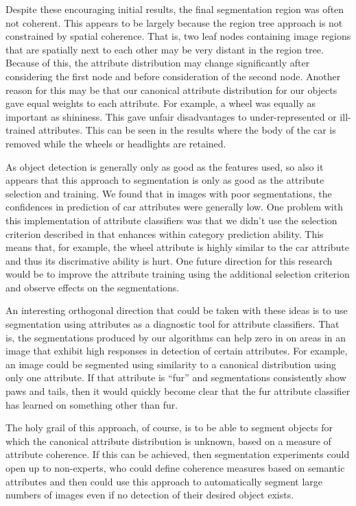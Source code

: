 \documentclass[10pt,twocolumn,letterpaper]{article}
\begin{document}
Despite these encouraging initial results, the final segmentation region
was often not coherent.
This appears to be largely because the region tree approach is not
constrained by spatial coherence.  That is, two leaf nodes containing image
regions that are spatially next to each other may be very distant in the
region tree.  Because of this, the attribute distribution may change significantly
after considering the first node and before consideration of the second node.
Another reason for this may be that our canonical attribute distribution for
our objects gave equal weights to each attribute.  For example, a wheel was
equally as important as shininess.  This gave unfair disadvantages to
under-represented or ill-trained attributes.  This can be seen in the results
where the body of the car is removed while the wheels or headlights are
retained.

As object detection is generally only as good as the features used, so also it
appears that this approach to segmentation is only as good as the attribute
selection and training.  We found that in images with poor segmentations, the
confidences in prediction of car attributes were generally low.  One problem
with this implementation of attribute classifiers was that we didn't use
the selection criterion described in \cite{farhadi09} that enhances within
category prediction ability.  This means that, for example, the wheel attribute
is highly similar to the car attribute and thus its discrimative ability
is hurt.  One future direction for this research would be to improve the attribute
training using the additional selection criterion and observe effects on
the segmentations.

An interesting orthogonal direction that could be taken with these ideas is to
use segmentation using attributes as a diagnostic tool for attribute classifiers.
That is, the segmentations produced by our algorithms can help zero in on areas
in an image that exhibit high responses in detection of certain attributes.
For example, an image could be segmented using similarity to a canonical distribution
using only one attribute.  If that attribute is ``fur'' and segmentations
consistently show paws and tails, then it would quickly become clear that
the fur attribute classifier has learned on something other than fur.

The holy grail of this approach, of course, is to be able to segment objects
for which the canonical attribute distribution is unknown, based on a measure
of attribute coherence.  If this can be achieved, then segmentation experiments
could open up to non-experts, who could define coherence measures based on
semantic attributes and then could use this approach to automatically segment large
numbers of images even if no detection of their desired object exists.
\end{document}
